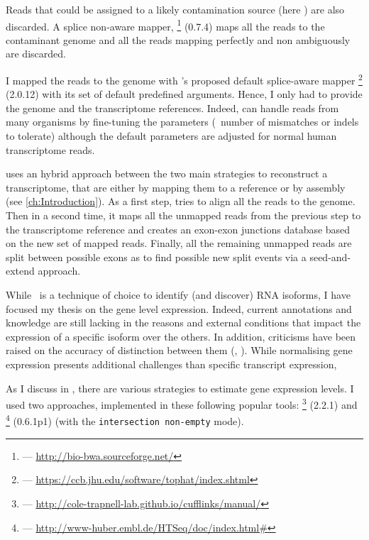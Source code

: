 Reads that could be assigned to a likely contamination source (here
) are also discarded. A splice non-aware mapper,
\footnote{ --- \href{http://bio-bwa.sourceforge.net/}%
{http://bio-bwa.sourceforge.net/}} (0.7.4) maps all the reads to the contaminant
genome and all the reads mapping perfectly and non ambiguously are discarded.

I mapped the reads to the genome with \irap's proposed default splice-aware mapper
\footnote{ ---
\href{https://ccb.jhu.edu/software/tophat/index.shtml}%
{https://ccb.jhu.edu/software/tophat/index.shtml}} (2.0.12) 
with its set of default predefined arguments. Hence, I only had to provide the
genome and the transcriptome references. Indeed,  can handle reads
from many organisms by fine-tuning the parameters (\eg\ number of mismatches or
indels to tolerate) although the default parameters are adjusted for normal human
transcriptome reads.

 uses an hybrid approach between the two main
strategies to reconstruct a transcriptome, that are either by mapping them to
a reference or by  assembly (see \cref{ch:Introduction}).
As a first step,  tries to align all the reads
to the genome. Then in a second time, it maps all the unmapped reads from
the previous step to the transcriptome reference and creates an exon-exon
junctions database based on the new set of mapped reads. Finally, all the
remaining unmapped reads are split between possible exons as to find
possible new split events via a seed-and-extend approach.


While \Rnaseq\ is a technique of choice to identify (and discover) \gls{RNA}
isoforms, I have focused my thesis on the gene level expression. Indeed, current
annotations and knowledge are still lacking in the reasons and
external conditions that impact the expression of a specific isoform over the
others. In addition, criticisms have been raised on the accuracy of distinction
between them (\cite{tamaraRNA}, \cite{ernestRNA}). While normalising gene
expression presents additional challenges than specific transcript expression,


As I discuss in , there are various strategies to estimate
gene expression levels. I used two approaches, implemented in these
following popular tools:
\footnote{ ---
\href{http://cole-trapnell-lab.github.io/cufflinks/manual/}%
{http://cole-trapnell-lab.github.io/cufflinks/manual/}} (2.2.1) 
and \footnote{ ---
\href{http://www-huber.embl.de/HTSeq/doc/index.html\#}%
{http://www-huber.embl.de/HTSeq/doc/index.html\#}} (0.6.1p1) (with the
\texttt{intersection non-empty} mode).


